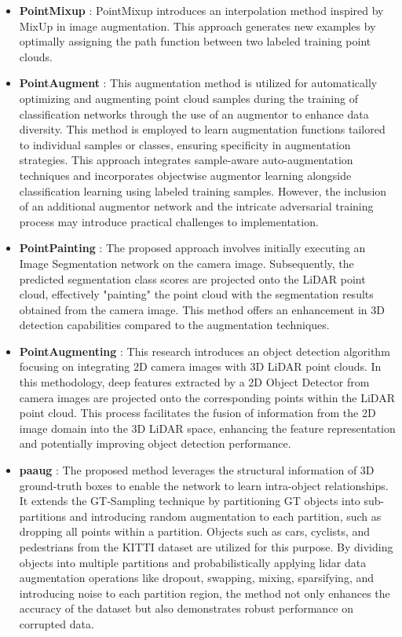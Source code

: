 \begin{itemize}
    \item \textbf{PointMixup} : PointMixup \parencite{pointmixup2020} introduces an interpolation method inspired by MixUp \parencite{mixup} in image augmentation. This approach generates new examples by optimally assigning the path function between two labeled training point clouds.
    \item \textbf{PointAugment} : This augmentation method \parencite{pointaugment2020}is utilized for automatically optimizing and augmenting point cloud samples during the training of classification networks through the use of an augmentor to enhance data diversity. This method is employed to learn augmentation functions tailored to individual samples or classes, ensuring specificity in augmentation strategies. This approach integrates sample-aware auto-augmentation techniques and incorporates objectwise augmentor learning alongside classification learning using labeled training samples. However, the inclusion of an additional augmentor network and the intricate adversarial training process may introduce practical challenges to implementation.
    \item \textbf{PointPainting} : The proposed approach \parencite{pointpainting2019} involves initially executing an Image Segmentation network on the camera image. Subsequently, the predicted segmentation class scores are projected onto the LiDAR point cloud, effectively "painting" the point cloud with the segmentation results obtained from the camera image. This method offers an enhancement in 3D detection capabilities compared to the augmentation techniques.
    \item \textbf{PointAugmenting} : This research \parencite{pointaugmenting2021} introduces an object detection algorithm focusing on integrating 2D camera images with 3D LiDAR point clouds. In this methodology, deep features extracted by a 2D Object Detector from camera images are projected onto the corresponding points within the LiDAR point cloud. This process facilitates the fusion of information from the 2D image domain into the 3D LiDAR space, enhancing the feature representation and potentially improving object detection performance.
    \item \textbf{\acrfull{paaug}} : The proposed method \parencite{pa_aug2020} leverages the structural information of 3D ground-truth boxes to enable the network to learn intra-object relationships. It extends the GT-Sampling technique by partitioning GT objects into sub-partitions and introducing random augmentation to each partition, such as dropping all points within a partition. Objects such as cars, cyclists, and pedestrians from the KITTI dataset are utilized for this purpose. By dividing objects into multiple partitions and probabilistically applying lidar data augmentation operations like dropout, swapping, mixing, sparsifying, and introducing noise to each partition region, the method not only enhances the accuracy of the dataset but also demonstrates robust performance on corrupted data.

\end{itemize}
